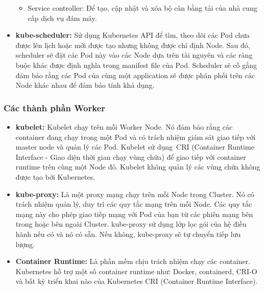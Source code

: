\documentclass[12pt,a4paper]{report}
\begin{document}
\begin{itemize}
\begin{itemize}
			\item Service controller: Để tạo, cập nhật và xóa bộ cân bằng tải của nhà cung cấp dịch vụ đám mây.
		\end{itemize}
		
		\item \textbf{kube-scheduler:}
		\subitem
		Sử dụng Kubernetes API để tìm, theo dõi các Pod chưa được lên lịch hoặc mới được tạo nhưng không được chỉ định Node. Sau đó, scheduler sẽ đặt các Pod này vào các Node dựa trên tài nguyên và các ràng buộc khác được định nghĩa trong manifest file của Pod. Scheduler sẽ cố gắng đảm bảo rằng các Pod của cùng một application sẽ được phân phối trên các Node khác nhau để đảm bảo tính khả dụng.
		
		\hspace{0.8cm}{Các yếu tố được tính đến để đưa ra quyết định lập lịch bao gồm: yêu cầu tài nguyên cá nhân và tập thể, các ràng buộc về phần cứng / phần mềm / chính sách, thông số kỹ thuật về mối quan hệ và chống mối quan hệ, vị trí dữ liệu, can thiệp giữa khối lượng công việc và thời hạn.}
	\end{itemize}
	
	\subsubsection{Các thành phần Worker}
	\smallskip
	\hspace{1cm}{Có nhiệm vụ xử lý khối lượng công việc của application trong cluster, duy trì các nhóm đang chạy và cung cấp môi trường runtime cho Kubernetes. Worker sẽ bao gồm 3 thành phần chính sau:}
	\begin{itemize}
		\item \textbf{kubelet:}
		\subitem
		Kubelet chạy trên mỗi Worker Node. Nó đảm bảo rằng các container đang chạy trong một Pod và có trách nhiệm giám sát giao tiếp với master node và quản lý các Pod. Kubelet sử dụng CRI (Container Runtime Interface - Giao diện thời gian chạy vùng chứa) để giao tiếp với container runtime trên cùng một Node đó. Kubelet không quản lý các vùng chứa không được tạo bởi Kubernetes.
		
		\item \textbf{kube-proxy:}
		\subitem
		Là một proxy mạng chạy trên mỗi Node trong Cluster. Nó có trách nhiệm quản lý, duy trì các quy tắc mạng trên mỗi Node. Các quy tắc mạng này cho phép giao tiếp mạng với Pod của bạn từ các phiên mạng bên trong hoặc bên ngoài Cluster. kube-proxy sử dụng lớp lọc gói của hệ điều hành nếu có và nó có sẵn. Nếu không, kube-proxy sẽ tự chuyển tiếp lưu lượng.
		
		\item \textbf{Container Runtime:}
		\subitem
		Là phần mềm chịu trách nhiệm chạy các container. Kubernetes hỗ trợ một số container runtime như: Docker, containerd, CRI-O và bất kỳ triển khai nào của Kubernetes CRI (Container Runtime Interface).
	\end{itemize}
	
\end{document}

